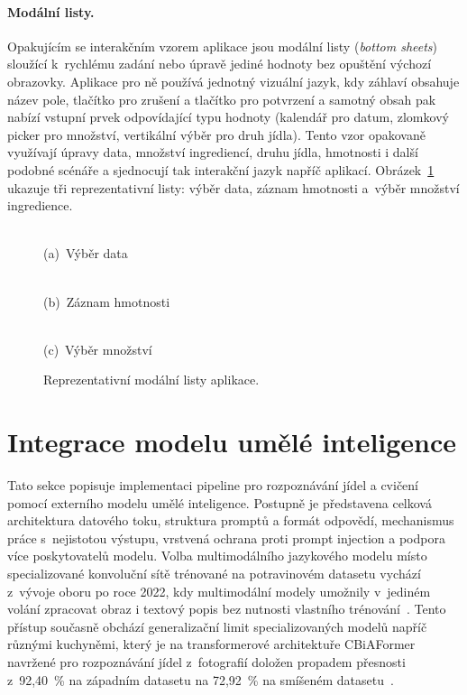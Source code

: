 \paragraph{Modální listy.}
Opakujícím se interakčním vzorem aplikace jsou modální listy (\emph{bottom sheets}) sloužící k~rychlému zadání nebo úpravě jediné hodnoty bez opuštění výchozí obrazovky.
Aplikace pro ně používá jednotný vizuální jazyk, kdy záhlaví obsahuje název pole, tlačítko pro zrušení a tlačítko pro potvrzení a samotný obsah pak nabízí vstupní prvek odpovídající typu hodnoty (kalendář pro datum, zlomkový picker pro množství, vertikální výběr pro druh jídla).
Tento vzor opakovaně využívají úpravy data, množství ingrediencí, druhu jídla, hmotnosti i další podobné scénáře a sjednocují tak interakční jazyk napříč aplikací.
Obrázek~\ref{fig:screenBottomSheets} ukazuje tři reprezentativní listy: výběr data, záznam hmotnosti a~výběr množství ingredience.

\begin{figure}[!htb]
	\centering
	\begin{minipage}[t]{0.31\textwidth}
		\centering
		\\(a)~Výběr data
	\end{minipage}\hfill
	\begin{minipage}[t]{0.31\textwidth}
		\centering
		\\(b)~Záznam hmotnosti
	\end{minipage}\hfill
	\begin{minipage}[t]{0.31\textwidth}
		\centering
		\\(c)~Výběr množství
	\end{minipage}
	\caption{Reprezentativní modální listy aplikace.}
	\label{fig:screenBottomSheets}
\end{figure}

\section{Integrace modelu umělé inteligence}
\label{sec:integraceAi}

Tato sekce popisuje implementaci pipeline pro rozpoznávání jídel a cvičení pomocí externího modelu umělé inteligence.
Postupně je představena celková architektura datového toku, struktura promptů a formát odpovědí, mechanismus práce s~nejistotou výstupu, vrstvená ochrana proti prompt injection a podpora více poskytovatelů modelu.
Volba multimodálního jazykového modelu místo specializované konvoluční sítě trénované na potravinovém datasetu vychází z~vývoje oboru po roce 2022, kdy multimodální modely umožnily v~jediném volání zpracovat obraz i textový popis bez nutnosti vlastního trénování~\cite{wang2026visionLanguageFood}.
Tento přístup současně obchází generalizační limit specializovaných modelů napříč různými kuchyněmi, který je na transformerové architektuře CBiAFormer navržené pro rozpoznávání jídel z~fotografií doložen propadem přesnosti z~92,40~\% na západním datasetu na 72,92~\% na smíšeném datasetu~\cite{liu2025deepLearning}.

